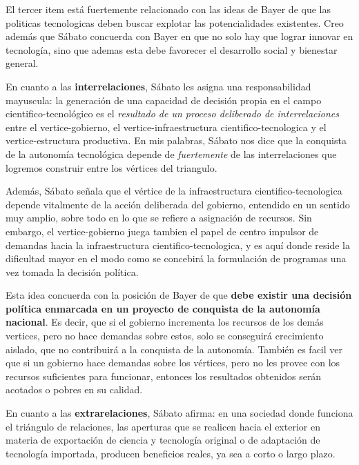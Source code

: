 El tercer item está fuertemente relacionado con las ideas de Bayer de que las politicas tecnologicas deben buscar explotar las potencialidades existentes. Creo además que Sábato concuerda con Bayer en que no solo hay que lograr innovar en tecnología, sino que ademas esta debe favorecer el desarrollo social y bienestar general.

\vspace{0.5em}

En cuanto a las \textbf{interrelaciones}, Sábato les asigna una responsabilidad mayuscula: la generación de una capacidad de decisión propia en el campo cientifico-tecnológico es el \textit{resultado de un proceso deliberado de interrelaciones} entre el vertice-gobierno, el vertice-infraestructura cientifico-tecnologica y el vertice-estructura productiva.
En mis palabras, Sábato nos dice que la conquista de la autonomía tecnológica depende de \textit{fuertemente} de las interrelaciones que logremos construir entre los vértices del triangulo.

Además, Sábato señala que el vértice de la infraestructura cientifico-tecnologica depende vitalmente de la acción deliberada del gobierno, entendido en un sentido muy amplio, sobre todo en lo que se refiere a asignación de recursos. Sin embargo, el vertice-gobierno juega tambien el papel de centro impulsor de demandas hacia la infraestructura cientifico-tecnologica, y es aquí donde reside la dificultad mayor en el modo como se concebirá la formulación de programas una vez tomada la decisión política.

Esta idea concuerda con la posición de Bayer de que \textbf{debe existir una decisión política enmarcada en un proyecto de conquista de la autonomía nacional}. Es decir, que si el gobierno incrementa los recursos de los demás vertices, pero no hace demandas sobre estos, solo se conseguirá crecimiento aislado, que no contribuirá a la conquista de la autonomía. También es facil ver que si un gobierno hace demandas sobre los vértices, pero no les provee con los recursos suficientes para funcionar, entonces los resultados obtenidos serán acotados o pobres en su calidad.

\vspace{0.5em}

En cuanto a las \textbf{extrarelaciones}, Sábato afirma: en una sociedad donde funciona el triángulo de relaciones, las aperturas que se realicen hacia el exterior en materia de exportación de ciencia y tecnología original o de adaptación de tecnología importada, producen beneficios reales, ya sea a corto o largo plazo.

